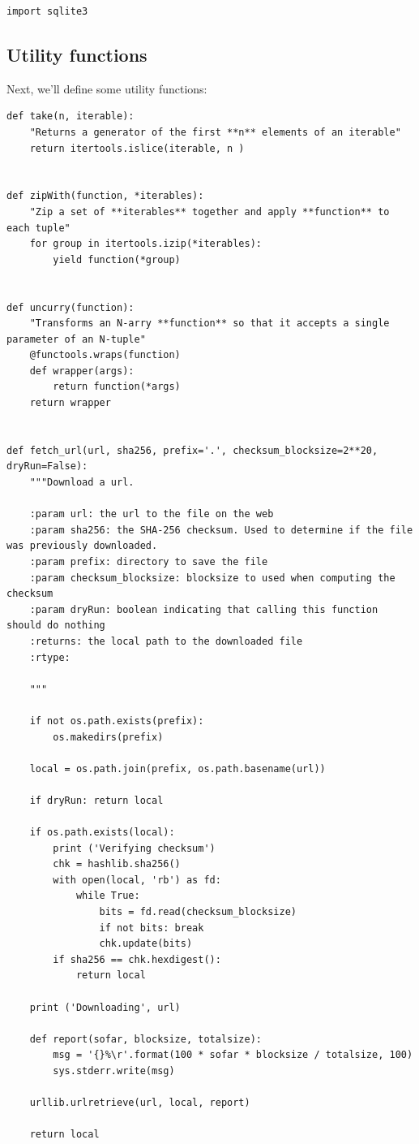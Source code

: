 \begin{lstlisting}
import sqlite3
\end{lstlisting}

\subsection{Utility functions}\label{utility-functions}

Next, we'll define some utility functions:

\begin{lstlisting}
def take(n, iterable):
    "Returns a generator of the first **n** elements of an iterable"
    return itertools.islice(iterable, n )


def zipWith(function, *iterables):
    "Zip a set of **iterables** together and apply **function** to each tuple"
    for group in itertools.izip(*iterables):
        yield function(*group)


def uncurry(function):
    "Transforms an N-arry **function** so that it accepts a single parameter of an N-tuple"
    @functools.wraps(function)
    def wrapper(args):
        return function(*args)
    return wrapper


def fetch_url(url, sha256, prefix='.', checksum_blocksize=2**20, dryRun=False):
    """Download a url.

    :param url: the url to the file on the web
    :param sha256: the SHA-256 checksum. Used to determine if the file was previously downloaded.
    :param prefix: directory to save the file
    :param checksum_blocksize: blocksize to used when computing the checksum
    :param dryRun: boolean indicating that calling this function should do nothing
    :returns: the local path to the downloaded file
    :rtype:

    """

    if not os.path.exists(prefix):
        os.makedirs(prefix)

    local = os.path.join(prefix, os.path.basename(url))

    if dryRun: return local

    if os.path.exists(local):
        print ('Verifying checksum')
        chk = hashlib.sha256()
        with open(local, 'rb') as fd:
            while True:
                bits = fd.read(checksum_blocksize)
                if not bits: break
                chk.update(bits)
        if sha256 == chk.hexdigest():
            return local

    print ('Downloading', url)

    def report(sofar, blocksize, totalsize):
        msg = '{}%\r'.format(100 * sofar * blocksize / totalsize, 100)
        sys.stderr.write(msg)

    urllib.urlretrieve(url, local, report)

    return local
\end{lstlisting}

